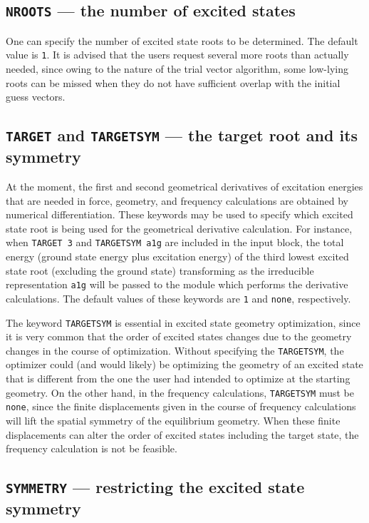 \subsection{{\tt NROOTS} --- the number of excited states}
 
One can specify the number of excited state roots to be determined.  The default
value is \verb+1+.  It is advised that the users request several more roots than actually
needed, since owing to the nature of the trial vector algorithm, some low-lying
roots can be missed when they do not have sufficient overlap with the initial guess
vectors.

\subsection{{\tt TARGET} and {\tt TARGETSYM} --- the target root and its symmetry}
 
At the moment, the first and second geometrical derivatives of excitation
energies that are needed in force, geometry, and frequency calculations are
obtained by numerical differentiation.  These keywords may be used to specify
which excited state root is being used for the geometrical derivative calculation.
For instance, when \verb+TARGET 3+ and \verb+TARGETSYM a1g+ are included in the
input block, the total energy (ground state energy plus excitation energy)
of the third lowest excited state root (excluding the ground state) transforming as
the irreducible representation \verb+a1g+ will be passed to the module which performs
the derivative calculations.  The default values of these keywords are \verb+1+ and \verb+none+,
respectively.
 
The keyword \verb+TARGETSYM+ is essential in excited state geometry
optimization, since it is very common that the order of excited states changes due to
the geometry changes in the course of optimization.  Without specifying the \verb+TARGETSYM+,
the optimizer could (and would likely) be optimizing the geometry of an excited state that
is different from the one the user had intended to optimize at the starting geometry.
On the other hand, in the frequency calculations, \verb+TARGETSYM+ must be \verb+none+,
since the finite displacements given in the course of frequency calculations will lift
the spatial symmetry of the equilibrium geometry.  When these finite displacements can
alter the order of excited states including the target state, the frequency calculation
is not be feasible.

\subsection{{\tt SYMMETRY} --- restricting the excited state symmetry}
 
